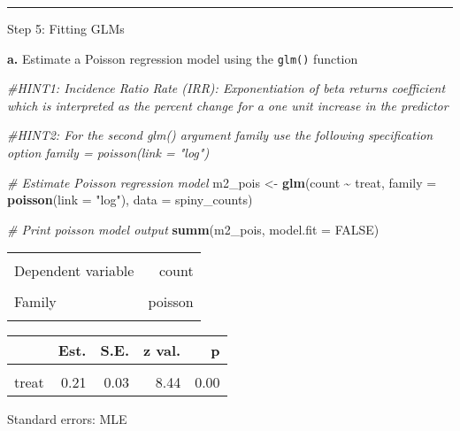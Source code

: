 \documentclass[
]{article}
\newenvironment{Shaded}{\begin{snugshade}}{\end{snugshade}}
\newcommand{\AttributeTok}[1]{\textcolor[rgb]{0.13,0.29,0.53}{#1}}
\newcommand{\CommentTok}[1]{\textcolor[rgb]{0.56,0.35,0.01}{\textit{#1}}}
\newcommand{\ConstantTok}[1]{\textcolor[rgb]{0.56,0.35,0.01}{#1}}
\newcommand{\FunctionTok}[1]{\textcolor[rgb]{0.13,0.29,0.53}{\textbf{#1}}}
\newcommand{\NormalTok}[1]{#1}
\newcommand{\OtherTok}[1]{\textcolor[rgb]{0.56,0.35,0.01}{#1}}
\newcommand{\SpecialCharTok}[1]{\textcolor[rgb]{0.81,0.36,0.00}{\textbf{#1}}}
\newcommand{\StringTok}[1]{\textcolor[rgb]{0.31,0.60,0.02}{#1}}
\begin{document}
\begin{center}\rule{0.5\linewidth}{0.5pt}\end{center}

Step 5: Fitting GLMs

\textbf{a.} Estimate a Poisson regression model using the \texttt{glm()}
function

\begin{Shaded}
\begin{Highlighting}[]
\CommentTok{\#HINT1: Incidence Ratio Rate (IRR): Exponentiation of beta returns coefficient which is interpreted as the \textquotesingle{}percent change\textquotesingle{} for a one unit increase in the predictor }

\CommentTok{\#HINT2: For the second glm() argument \textasciigrave{}family\textasciigrave{} use the following specification option \textasciigrave{}family = poisson(link = "log")\textasciigrave{}}

\CommentTok{\# Estimate Poisson regression model}
\NormalTok{m2\_pois }\OtherTok{\textless{}{-}} \FunctionTok{glm}\NormalTok{(count }\SpecialCharTok{\textasciitilde{}}\NormalTok{ treat,}
               \AttributeTok{family =} \FunctionTok{poisson}\NormalTok{(}\AttributeTok{link =} \StringTok{"log"}\NormalTok{),}
               \AttributeTok{data =}\NormalTok{ spiny\_counts)}

\CommentTok{\# Print poisson model output}
\FunctionTok{summ}\NormalTok{(m2\_pois, }\AttributeTok{model.fit =} \ConstantTok{FALSE}\NormalTok{)}
\end{Highlighting}
\end{Shaded}

\begin{table}[!h]
\centering
\begin{tabular}{lr}
\toprule
\cellcolor{gray!10}{Observations} & \cellcolor{gray!10}{252}\\
Dependent variable & count\\
\cellcolor{gray!10}{Type} & \cellcolor{gray!10}{Generalized linear model}\\
Family & poisson\\
\cellcolor{gray!10}{Link} & \cellcolor{gray!10}{log}\\
\bottomrule
\end{tabular}
\end{table}  \begin{table}[!h]
\centering
\begin{threeparttable}
\begin{tabular}{lrrrr}
\toprule
  & Est. & S.E. & z val. & p\\
\midrule
\cellcolor{gray!10}{(Intercept)} & \cellcolor{gray!10}{3.12} & \cellcolor{gray!10}{0.02} & \cellcolor{gray!10}{171.74} & \cellcolor{gray!10}{0.00}\\
treat & 0.21 & 0.03 & 8.44 & 0.00\\
\bottomrule
\end{tabular}
\begin{tablenotes}
\item Standard errors: MLE
\end{tablenotes}
\end{threeparttable}
\end{table}
\end{document}
